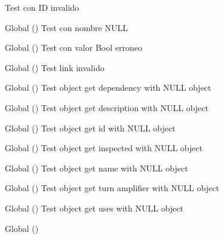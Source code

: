 \begin{DoxyRefList}
%
Test con ID invalido  
\item[Global \doxylink{link__test_8c_aa66c1e991620a5a758ba6e4d6b4a8b73}{test2\+\_\+link\+\_\+set\+\_\+name} ()]\label{test__test000063}%
%
Test con nombre NULL  
\item[Global \doxylink{link__test_8c_a4f7f80db70fdda86df30c5e35c851d65}{test2\+\_\+link\+\_\+set\+\_\+open} ()]\label{test__test000067}%
%
Test con valor Bool erroneo  
\item[Global \doxylink{link__test_8c_ab930369652dcd18fce8eafd272c56f42}{test2\+\_\+link\+\_\+set\+\_\+start} ()]\label{test__test000075}%
%
Test link invalido  
\item[Global \doxylink{object__test_8c_af8746713a9b762b1295bb1c4186260b8}{test2\+\_\+object\+\_\+get\+\_\+dependency} ()]\label{test__test000114}%
%
Test object get dependency with NULL object  
\item[Global \doxylink{object__test_8c_a7752855f5ce403b1209b54b757fd52c8}{test2\+\_\+object\+\_\+get\+\_\+desc} ()]\label{test__test000096}%
%
Test object get description with NULL object  
\item[Global \doxylink{object__test_8c_a1ff250f0f43297f57fcce1f3a6ae490b}{test2\+\_\+object\+\_\+get\+\_\+id} ()]\label{test__test000088}%
%
Test object get id with NULL object  
\item[Global \doxylink{object__test_8c_a84bf38b8b9b8ffbd0665c14686de8868}{test2\+\_\+object\+\_\+get\+\_\+inspected} ()]\label{test__test000100}%
%
Test object get inspected with NULL object  
\item[Global \doxylink{object__test_8c_abdfafbc7b8588d3dcdb05fd2beb2397e}{test2\+\_\+object\+\_\+get\+\_\+name} ()]\label{test__test000092}%
%
Test object get name with NULL object  
\item[Global \doxylink{object__test_8c_a53739791542b1f8c6e847e0668760663}{test2\+\_\+object\+\_\+get\+\_\+turn\+\_\+amplifier} ()]\label{test__test000110}%
%
Test object get turn amplifier with NULL object  
\item[Global \doxylink{object__test_8c_a2adc04937be72cc9f61abe18f3a3b132}{test2\+\_\+object\+\_\+get\+\_\+uses} ()]\label{test__test000106}%
%
Test object get uses with NULL object  
\item[Global \doxylink{object__test_8c_a57499e0ae8248f1182072920b47add5e}{test2\+\_\+object\+\_\+print} ()]\label{test__test000102}%

\end{DoxyRefList}
